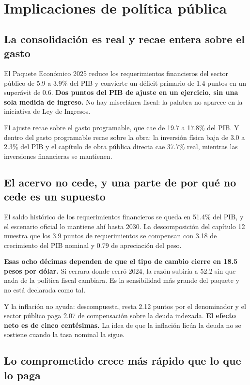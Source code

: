\chapter{Implicaciones de política pública}

\section{La consolidación es real y recae entera sobre el gasto}

El Paquete Económico 2025 reduce los requerimientos financieros del sector público
de 5.9 a 3.9\% del PIB y convierte un déficit primario de 1.4 puntos en un
superávit de 0.6. \textbf{Dos puntos del PIB de ajuste en un ejercicio, sin una
sola medida de ingreso.} No hay miscelánea fiscal: la palabra no aparece en la
iniciativa de Ley de Ingresos.

El ajuste recae sobre el gasto programable, que cae de 19.7 a 17.8\% del PIB. Y
dentro del gasto programable recae sobre la obra: la inversión física baja de 3.0
a 2.3\% del PIB y el capítulo de obra pública directa cae 37.7\% real, mientras
las inversiones financieras se mantienen.

\section{El acervo no cede, y una parte de por qué no cede es un supuesto}

El saldo histórico de los requerimientos financieros se queda en 51.4\% del PIB, y
el escenario oficial lo mantiene ahí hasta 2030. La descomposición del capítulo 12
muestra que los 3.9 puntos de requerimientos se compensan con 3.18 de crecimiento
del PIB nominal y 0.79 de apreciación del peso.

\textbf{Esas ocho décimas dependen de que el tipo de cambio cierre en 18.5 pesos
por dólar.} Si cerrara donde cerró 2024, la razón subiría a 52.2 sin que nada de
la política fiscal cambiara. Es la sensibilidad más grande del paquete y no está
declarada como tal.

Y la inflación no ayuda: descompuesta, resta 2.12 puntos por el denominador y el
sector público paga 2.07 de compensación sobre la deuda indexada. \textbf{El
efecto neto es de cinco centésimas.} La idea de que la inflación licúa la deuda no
se sostiene cuando la tasa nominal la sigue.

\section{Lo comprometido crece más rápido que lo que lo paga}

